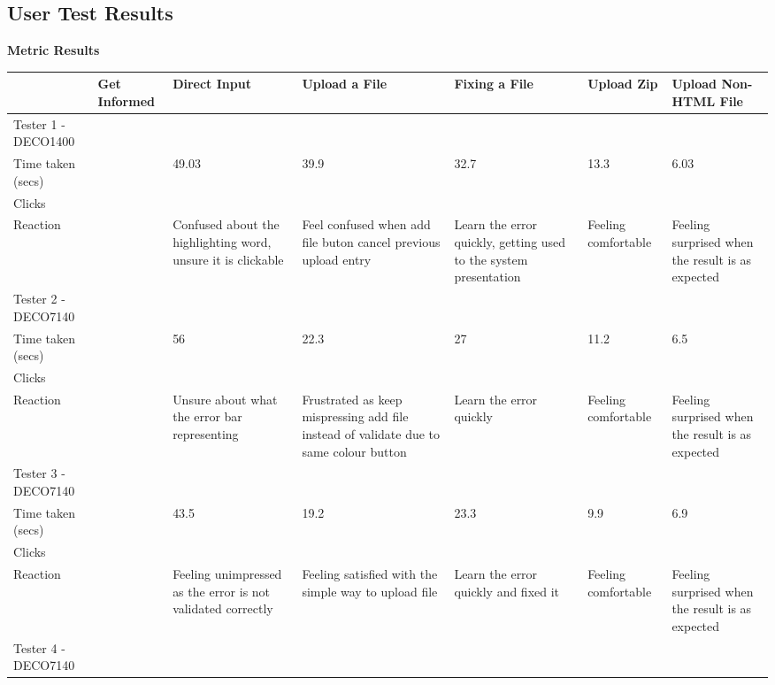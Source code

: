 \documentclass[10pt]{article}
\begin{document}
\begin{landscape}
\pagestyle{empty}
\subsection*{User Test Results}

\textbf{Metric Results}

\begin{center}
\begin{longtabu} to 10in {l|l|X<{\strut}|X<{\strut}|X<{\strut}|X<{\strut}|X<{\strut}}
~& Get Informed & Direct Input & Upload a File  & Fixing a File& Upload Zip  & Upload Non-HTML File  \\ \hline\hline
Tester 1 - DECO1400  & ~& ~& ~  & ~& ~   & ~ \\ \hline\hline
Time taken (secs)& ~& 49.03& 39.9   & 32.7 & 13.3& 6.03  \\ \hline
Clicks   & ~& ~& ~  & ~& ~   & ~ \\ \hline
Reaction & ~& Confused about the highlighting word, unsure it is clickable & Feel confused when add file buton cancel previous upload entry & Learn the error quickly, getting used to the system presentation & Feeling comfortable & Feeling surprised when the result is as expected  \\ \hline\hline
Tester 2 - DECO7140  & ~& ~& ~  & ~& ~   & ~ \\ \hline\hline
Time taken (secs)& ~& 56   & 22.3   & 27   & 11.2& 6.5   \\ \hline
Clicks   & ~& ~& ~  & ~& ~   & ~ \\ \hline
Reaction & ~& Unsure about what the error bar representing & Frustrated as keep mispressing add file instead of validate due to same colour button  & Learn the error quickly  & Feeling comfortable & Feeling surprised when the result is as expected  \\ \hline\hline
Tester 3 - DECO7140  & ~& ~& ~  & ~& ~   & ~ \\ \hline\hline
Time taken (secs)& ~& 43.5 & 19.2   & 23.3 & 9.9 & 6.9   \\ \hline
Clicks   & ~& ~& ~  & ~& ~   & ~ \\ \hline
Reaction & ~& Feeling unimpressed as the error is not validated correctly  & Feeling satisfied with the simple way to upload file   & Learn the error quickly and fixed it & Feeling comfortable & Feeling surprised when the result is as expected  \\ \hline\hline
Tester 4 - DECO7140  & ~& ~& ~  & ~& ~   & ~ \\ \hline\hline

\end{longtabu}
\end{center}
\end{landscape}
\end{document}
